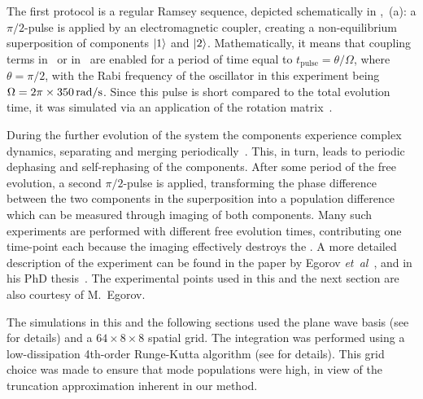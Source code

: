 The first protocol is a regular Ramsey sequence, depicted schematically in ,~(a): a $\pi/2$-pulse is applied by an electromagnetic coupler, creating a non-equilibrium superposition of components $\mbox{\ensuremath{\left\vert 1 \right\rangle}}$ and $\mbox{\ensuremath{\left\vert 2 \right\rangle}}$.
Mathematically, it means that coupling terms in~ or in~ are enabled for a period of time equal to $t_{\mathrm{pulse}} = \theta / \Omega$, where $\theta = \pi/2$, with the Rabi frequency of the oscillator in this experiment being $\Omega = 2\pi \times 350\mbox{\ensuremath{\,\mathrm{rad/s}}}$.
Since this pulse is short compared to the total evolution time, it was simulated via an application of the rotation matrix~.

During the further evolution of the system the components experience complex dynamics, separating and merging periodically~\cite{Mertes2007}.
This, in turn, leads to periodic dephasing and self-rephasing of the  components.
After some period of the free evolution, a second $\pi/2$-pulse is applied, transforming the phase difference between the two components in the superposition into a population difference which can be measured through imaging of both  components.
Many such experiments are performed with different free evolution times, contributing one time-point each because the imaging effectively destroys the .
A more detailed description of the experiment can be found in the paper by Egorov \textit{et~al}~\cite{Egorov2011}, and in his PhD thesis~\cite{Egorov2012}.
The experimental points used in this and the next section are also courtesy of M.~Egorov.

The simulations in this and the following sections used the plane wave basis (see  for details) and a $64\times8\times8$ spatial grid.
The integration was performed using a low-dissipation 4th-order Runge-Kutta algorithm (see  for details).
This grid choice was made to ensure that mode populations were high, in view of the truncation approximation inherent in our method.

